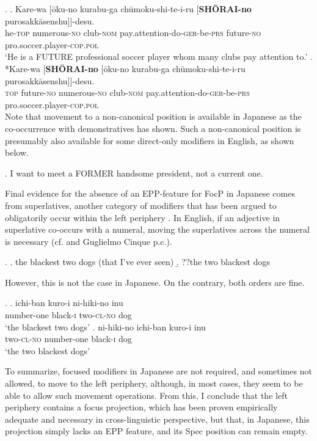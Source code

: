 \ex. \ag. Kare-wa [ōku-no kurabu-ga chūmoku-shi-te-i-ru [\textbf{SHŌRAI-no} purosakkāsenshu]]-desu.\\
he-\textsc{top} numerous-\textsc{no} club-\textsc{nom} pay.attention-do-\textsc{ger}-be-\textsc{prs} future-\textsc{no} pro.soccer.player-\textsc{cop.pol}\\
`He is a FUTURE professional soccer player whom many clubs pay attention to.’
\bg. *Kare-wa [\textbf{SHŌRAI-no} [ōku-no kurabu-ga chūmoku-shi-te-i-ru purosakkāsenshu]]-desu.\\
\textsc{top} future-\textsc{no} numerous-\textsc{no} club-\textsc{nom} pay.attention-do-\textsc{ger}-be-\textsc{prs} pro.soccer.player-\textsc{cop.pol}\\

Note that movement to a non-canonical position is available in Japanese as the co-occurrence with demonstratives has shown. Such a non-canonical position is presumably also available for some direct-only modifiers in English, as shown below.

\ex. I want to meet a FORMER handsome president, not a current one.

Final evidence for the absence of an EPP-feature for FocP in Japanese comes from superlatives, another category of modifiers that has been argued to obligatorily occur within the left periphery \citep{cinque:2010:adj, cinque:2023:linearization}. In  English, if an adjective in superlative co-occurs with a numeral, moving the superlatives across the numeral is necessary (cf. \citealt[11]{cinque:2023:linearization} and Guglielmo Cinque p.c.).

\ex. \a. the blackest two dogs (that I've ever seen)
\b. ??the two blackest dogs

However, this is not the case in Japanese. On the contrary, both orders are fine.

\ex. \ag. ichi-ban kuro-i ni-hiki-no inu\\
number-one black-\textsc{i} two-\textsc{cl-no} dog\\
`the blackest two dogs'
\bg. ni-hiki-no ichi-ban kuro-i inu\\
two-\textsc{cl-no} number-one black-\textsc{i} dog\\
`the two blackest dogs'

To summarize, focused modifiers in Japanese are not required, and sometimes not allowed, to move to the left periphery, although, in most cases, they seem to be able to allow such movement operations. From this, I conclude that the left periphery contains a focus projection, which has been proven empirically adequate and necessary in cross-linguistic perspective, but that, in Japanese, this projection simply lacks an EPP feature, and its Spec position can remain empty.

